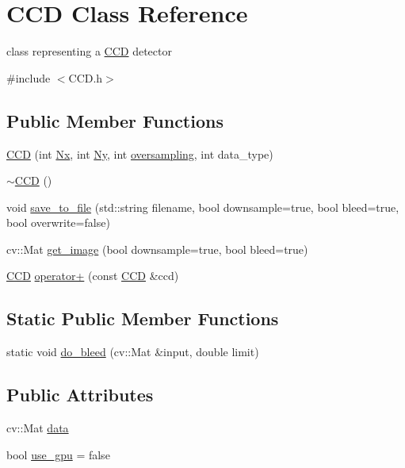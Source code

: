 \hypertarget{class_c_c_d}{}\section{C\+CD Class Reference}
\label{class_c_c_d}


class representing a \hyperlink{class_c_c_d}{C\+CD} detector  




{\ttfamily \#include $<$C\+C\+D.\+h$>$}

\subsection*{Public Member Functions}
\begin{DoxyCompactItemize}
\item 
\hyperlink{class_c_c_d_a61f17e0715aada9a29906ff5486d448b}{C\+CD} (int \hyperlink{class_c_c_d_abe89ab0452f494147601a5c323e52588}{Nx}, int \hyperlink{class_c_c_d_a31f3c760f9ead50dbd3c7272314ddc9e}{Ny}, int \hyperlink{class_c_c_d_a147d14d779dc54c05b3fc65a4e97c698}{oversampling}, int data\+\_\+type)
\item 
\hyperlink{class_c_c_d_abec74b1675c8313078686c62596cc104}{$\sim$\+C\+CD} ()
\item 
void \hyperlink{class_c_c_d_a2c03b076762520d22424f765f97691f7}{save\+\_\+to\+\_\+file} (std\+::string filename, bool downsample=true, bool bleed=true, bool overwrite=false)
\item 
cv\+::\+Mat \hyperlink{class_c_c_d_ae3a55b1799c2e4f25cef3160f6d65c68}{get\+\_\+image} (bool downsample=true, bool bleed=true)
\item 
\hyperlink{class_c_c_d}{C\+CD} \hyperlink{class_c_c_d_addede6d5e44ddb13370396c77fbf7178}{operator+} (const \hyperlink{class_c_c_d}{C\+CD} \&ccd)
\end{DoxyCompactItemize}
\subsection*{Static Public Member Functions}
\begin{DoxyCompactItemize}
\item 
static void \hyperlink{class_c_c_d_ab04045e3277a84af6e1cefc24ede448c}{do\+\_\+bleed} (cv\+::\+Mat \&input, double limit)
\end{DoxyCompactItemize}
\subsection*{Public Attributes}
\begin{DoxyCompactItemize}
\item 
cv\+::\+Mat \hyperlink{class_c_c_d_abb1dc40d976f69d6a8ce01c407810e6b}{data}
\item 
bool \hyperlink{class_c_c_d_abeed44146ecffcd143263700413a41bd}{use\+\_\+gpu} = false
\end{DoxyCompactItemize}
